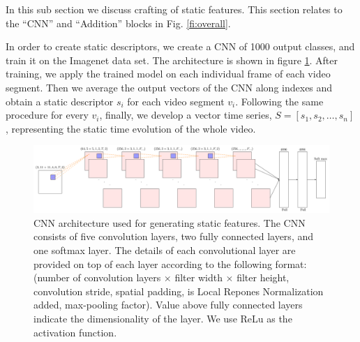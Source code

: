 In this sub section we discuss crafting of static features. This section relates to
the ``CNN'' and ``Addition'' blocks in Fig. \ref{fi:overall}.

In order to create static descriptors, we create a CNN of 1000 output classes, and train it on the Imagenet data set. The architecture is shown in figure \ref{fi:cnn}.
After training, we apply the trained model on each individual frame of each video segment. Then we average the output vectors of the CNN
along indexes and obtain a static descriptor $s_{i}$ for each video segment $v_{i}$. Following the same
procedure for every $v_{i}$, finally, we develop a vector time series,
$S =[s_{1}, s_{2}, \dots, s_{n}]$, representing the static time evolution of the whole video.

\begin{figure}
  \centering
  \includegraphics[scale=0.5]{./figures/nw.pdf}
  \caption{CNN architecture used for generating static features. The CNN consists of five convolution layers,
  two fully connected layers, and one softmax layer. The details of each convolutional layer are provided on top of each layer
  according to the following format:(number of convolution layers $\times$ filter width $\times$ filter height, convolution stride,
  spatial padding, is Local Repones Normalization added, max-pooling factor). Value above fully connected layers indicate the dimensionality of the layer.
  We use ReLu as the activation function.}
\label{fi:cnn}
\end{figure} 